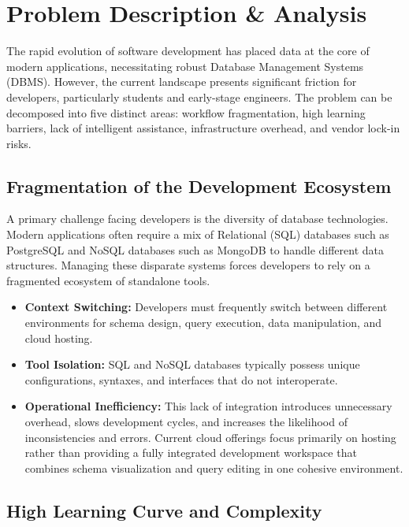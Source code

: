 \section{Problem Description \& Analysis}

The rapid evolution of software development has placed data at the core of modern applications, necessitating robust Database Management Systems (DBMS). However, the current landscape presents significant friction for developers, particularly students and early-stage engineers. The problem can be decomposed into five distinct areas: workflow fragmentation, high learning barriers, lack of intelligent assistance, infrastructure overhead, and vendor lock-in risks.

\subsection{Fragmentation of the Development Ecosystem}

A primary challenge facing developers is the diversity of database technologies. Modern applications often require a mix of Relational (SQL) databases such as PostgreSQL and NoSQL databases such as MongoDB to handle different data structures. Managing these disparate systems forces developers to rely on a fragmented ecosystem of standalone tools.

\begin{itemize}
    \item \textbf{Context Switching:} Developers must frequently switch between different environments for schema design, query execution, data manipulation, and cloud hosting.
    \item \textbf{Tool Isolation:} SQL and NoSQL databases typically possess unique configurations, syntaxes, and interfaces that do not interoperate.
    \item \textbf{Operational Inefficiency:} This lack of integration introduces unnecessary overhead, slows development cycles, and increases the likelihood of inconsistencies and errors. Current cloud offerings focus primarily on hosting rather than providing a fully integrated development workspace that combines schema visualization and query editing in one cohesive environment.
\end{itemize}

\subsection{High Learning Curve and Complexity}

